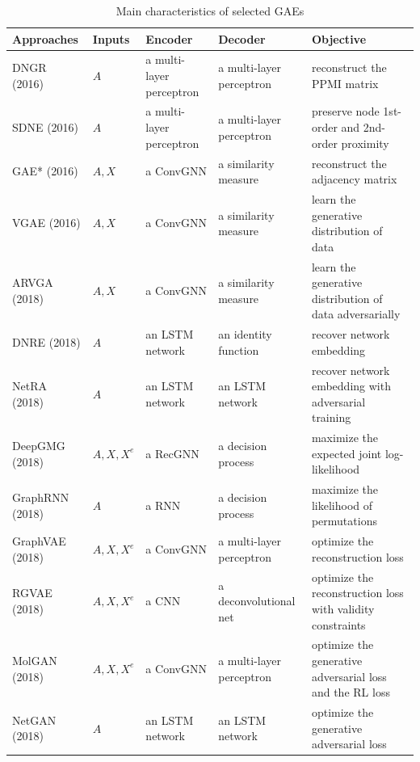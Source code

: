 	
\begin{table}[]
		\caption{Main characteristics of selected  GAEs}
		\label{tab:summary_gae}
		\centering
\begin{tabular}{lllll}
\toprule
Approaches & Inputs & Encoder & Decoder & Objective  \\ \toprule
  DNGR (2016) \cite{cao2016deep}         &  $A$      &    a multi-layer perceptron     &  a multi-layer perceptron       &  reconstruct the PPMI matrix           \\ \midrule
  SDNE (2016) \cite{wang2016sdne}         &  $A$      &   a multi-layer perceptron     &  a multi-layer perceptron      &        preserve node 1st-order and 2nd-order proximity       \\ \midrule
  GAE* (2016) \cite{kipf2016variational}          &  $A,X$      & a ConvGNN        & a similarity measure         &  reconstruct the adjacency matrix              \\ \midrule
  VGAE (2016) \cite{kipf2016variational}          &  $A,X$      &      a ConvGNN       & a similarity measure        &         learn the generative distribution of data       \\ \midrule
  ARVGA (2018) \cite{pan2018adversarially} &   $A,X$     &   a ConvGNN        & a similarity measure         &    learn the generative distribution of data adversarially            \\ \midrule
  DNRE (2018) \cite{tu2018deep} &   $A$     &  an LSTM network       &  an identity function       &  recover network embedding               \\ \midrule
  NetRA (2018) \cite{yu2018learning}&   $A$     &   an LSTM network       &    an LSTM network     &      recover network embedding with adversarial training          \\ \midrule
  DeepGMG (2018) \cite{li2018learning}&   $A,X,X^e$     &   a RecGNN      &  a decision process       &      maximize the expected joint log-likelihood           \\ \midrule
  GraphRNN (2018) \cite{you2018graphrnn}&    $A$    &  a RNN      &  a decision process       &        maximize the likelihood of permutations         \\ \midrule
  GraphVAE (2018) \cite{simonovsky2018graphvae}&  $A,X,X^e$     &  a ConvGNN       & a multi-layer perceptron       &    optimize the reconstruction loss            \\ \midrule
  RGVAE (2018) \cite{ma2018constrained}&   $A,X,X^e$      &   a CNN     & a deconvolutional net       &  optimize the reconstruction loss  with validity constraints              \\ \midrule
  MolGAN (2018) \cite{de2018molgan}&   $A,X,X^e$     &  a ConvGNN       &  a multi-layer perceptron      &     optimize the generative adversarial loss and the RL loss           \\ \midrule
  NetGAN (2018) \cite{bojchevski2018netgan}&   $A$     &    an LSTM network     &  an LSTM network       &          optimize the generative adversarial loss      \\ \midrule
\end{tabular}
\end{table}


